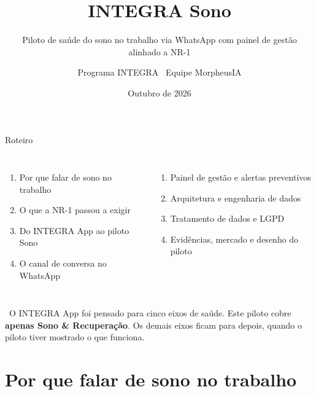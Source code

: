 \documentclass[aspectratio=169,10pt]{beamer}
\title{INTEGRA Sono}
\subtitle{Piloto de saúde do sono no trabalho via WhatsApp com painel de
  gestão alinhado a NR-1}
\author{Programa INTEGRA \textperiodcentered\ Equipe MorpheusIA}
\institute{Proposta técnica para discussão}
\date{Outubro de 2026}
\begin{document}
\maketitle

\begin{frame}{Roteiro}
\begin{columns}[T]
\begin{enumerate}
  \item[\color{lavanda}\faBed] Por que falar de sono no trabalho
  \item[\color{lavanda}\faBalanceScale] O que a NR-1 passou a exigir
  \item[\color{lavanda}\faSeedling] Do INTEGRA App ao piloto Sono
  \item[\color{lavanda}\faWhatsapp] O canal de conversa no WhatsApp
\end{enumerate}
\begin{enumerate}
  \item[\color{lavanda}\faChartBar] Painel de gestão e alertas preventivos
  \item[\color{lavanda}\faProjectDiagram] Arquitetura e engenharia de dados
  \item[\color{lavanda}\faUserShield] Tratamento de dados e LGPD
  \item[\color{lavanda}\faFlask] Evidências, mercado e desenho do piloto
\end{enumerate}
\end{columns}
\vfill
\begin{tcolorbox}[colback=nevoa,colframe=nevoa,arc=3pt,left=6pt]
\small\faInfoCircle\ O INTEGRA App foi pensado para cinco eixos de saúde.
Este piloto cobre \textbf{apenas Sono \& Recuperação}. Os demais eixos
ficam para depois, quando o piloto tiver mostrado o que funciona.
\end{tcolorbox}
\end{frame}

\section{Por que falar de sono no trabalho}
\end{document}
